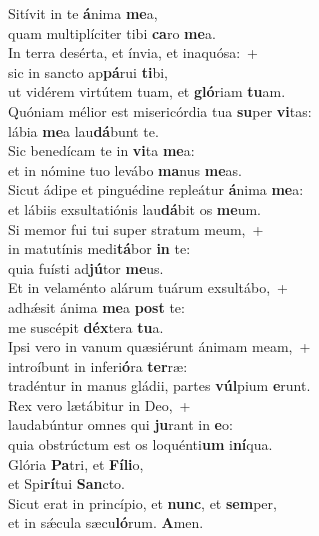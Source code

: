 \evenverse Sitívit in te \textbf{á}nima \textbf{me}a,~\*\\
\evenverse quam multiplíciter tibi \textbf{ca}ro \textbf{me}a.\\
\oddverse In terra desérta, et ínvia, et inaquósa:~+\\
\oddverse  sic in sancto ap\textbf{pá}rui \textbf{ti}bi,~\*\\
\oddverse ut vidérem virtútem tuam, et \textbf{gló}riam \textbf{tu}am.\\
\evenverse Quóniam mélior est misericórdia tua \textbf{su}per \textbf{vi}tas:~\*\\
\evenverse lábia \textbf{me}a lau\textbf{dá}bunt te.\\
\oddverse Sic benedícam te in \textbf{vi}ta \textbf{me}a:~\*\\
\oddverse et in nómine tuo levábo \textbf{ma}nus \textbf{me}as.\\
\evenverse Sicut ádipe et pinguédine repleátur \textbf{á}nima \textbf{me}a:~\*\\
\evenverse et lábiis exsultatiónis lau\textbf{dá}bit os \textbf{me}um.\\
\oddverse Si memor fui tui super stratum meum,~+\\
\oddverse  in matutínis medi\textbf{tá}bor \textbf{in} te:~\*\\
\oddverse quia fuísti ad\textbf{jú}tor \textbf{me}us.\\
\evenverse Et in velaménto alárum tuárum exsultábo,~+\\
\evenverse  adhǽsit ánima \textbf{me}a \textbf{post} te:~\*\\
\evenverse me suscépit \textbf{déx}tera \textbf{tu}a.\\
\oddverse Ipsi vero in vanum quæsiérunt ánimam meam,~+\\
\oddverse  introíbunt in inferi\textbf{ó}ra \textbf{ter}ræ:~\*\\
\oddverse tradéntur in manus gládii, partes \textbf{vúl}pium \textbf{e}runt.\\
\evenverse Rex vero lætábitur in Deo,~+\\
\evenverse  laudabúntur omnes qui \textbf{ju}rant in \textbf{e}o:~\*\\
\evenverse quia obstrúctum est os loquénti\textbf{um} i\textbf{ní}qua.\\
\oddverse Glória \textbf{Pa}tri, et \textbf{Fí}\textbf{li}o,~\*\\
\oddverse et Spi\textbf{rí}tui \textbf{San}cto.\\
\evenverse Sicut erat in princípio, et \textbf{nunc}, et \textbf{sem}per,~\*\\
\evenverse et in sǽcula sæcu\textbf{ló}rum. \textbf{A}men.\\
